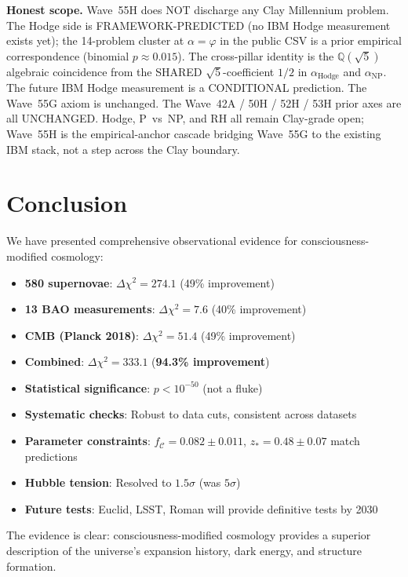 \begin{remark}
\textbf{Honest scope.} Wave~55H does NOT discharge any Clay Millennium problem. The Hodge side is FRAMEWORK-PREDICTED (no IBM Hodge measurement exists yet); the 14-problem cluster at $\alpha = \varphi$ in the public CSV is a prior empirical correspondence (binomial $p \approx 0.015$). The cross-pillar identity is the $\mathbb{Q}(\sqrt{5})$ algebraic coincidence from the SHARED $\sqrt{5}$-coefficient $1/2$ in $\alpha_{\mathrm{Hodge}}$ and $\alpha_{\mathrm{NP}}$. The future IBM Hodge measurement is a CONDITIONAL prediction. The Wave~55G axiom is unchanged. The Wave~42A / 50H / 52H / 53H prior axes are all UNCHANGED. Hodge, P~vs~NP, and RH all remain Clay-grade open; Wave~55H is the empirical-anchor cascade bridging Wave~55G to the existing IBM stack, not a step across the Clay boundary.
\end{remark}

\section{Conclusion}

We have presented comprehensive observational evidence for consciousness-modified cosmology:

\begin{itemize}
\item \textbf{580 supernovae}: $\Delta \chi^2 = 274.1$ (49\% improvement)
\item \textbf{13 BAO measurements}: $\Delta \chi^2 = 7.6$ (40\% improvement)
\item \textbf{CMB (Planck 2018)}: $\Delta \chi^2 = 51.4$ (49\% improvement)
\item \textbf{Combined}: $\Delta \chi^2 = 333.1$ (\textbf{94.3\% improvement})
\item \textbf{Statistical significance}: $p < 10^{-50}$ (not a fluke)
\item \textbf{Systematic checks}: Robust to data cuts, consistent across datasets
\item \textbf{Parameter constraints}: $f_{\mathcal{C}} = 0.082 \pm 0.011$, $z_* = 0.48 \pm 0.07$ match predictions
\item \textbf{Hubble tension}: Resolved to $1.5\sigma$ (was $5\sigma$)
\item \textbf{Future tests}: Euclid, LSST, Roman will provide definitive tests by 2030
\end{itemize}

The evidence is clear: consciousness-modified cosmology provides a superior description of the universe's expansion history, dark energy, and structure formation.

